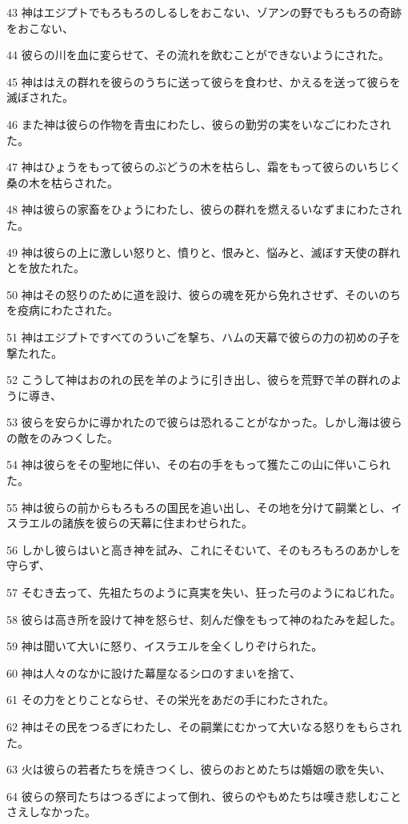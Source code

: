 \par 43 神はエジプトでもろもろのしるしをおこない、ゾアンの野でもろもろの奇跡をおこない、
\par 44 彼らの川を血に変らせて、その流れを飲むことができないようにされた。
\par 45 神ははえの群れを彼らのうちに送って彼らを食わせ、かえるを送って彼らを滅ぼされた。
\par 46 また神は彼らの作物を青虫にわたし、彼らの勤労の実をいなごにわたされた。
\par 47 神はひょうをもって彼らのぶどうの木を枯らし、霜をもって彼らのいちじく桑の木を枯らされた。
\par 48 神は彼らの家畜をひょうにわたし、彼らの群れを燃えるいなずまにわたされた。
\par 49 神は彼らの上に激しい怒りと、憤りと、恨みと、悩みと、滅ぼす天使の群れとを放たれた。
\par 50 神はその怒りのために道を設け、彼らの魂を死から免れさせず、そのいのちを疫病にわたされた。
\par 51 神はエジプトですべてのういごを撃ち、ハムの天幕で彼らの力の初めの子を撃たれた。
\par 52 こうして神はおのれの民を羊のように引き出し、彼らを荒野で羊の群れのように導き、
\par 53 彼らを安らかに導かれたので彼らは恐れることがなかった。しかし海は彼らの敵をのみつくした。
\par 54 神は彼らをその聖地に伴い、その右の手をもって獲たこの山に伴いこられた。
\par 55 神は彼らの前からもろもろの国民を追い出し、その地を分けて嗣業とし、イスラエルの諸族を彼らの天幕に住まわせられた。
\par 56 しかし彼らはいと高き神を試み、これにそむいて、そのもろもろのあかしを守らず、
\par 57 そむき去って、先祖たちのように真実を失い、狂った弓のようにねじれた。
\par 58 彼らは高き所を設けて神を怒らせ、刻んだ像をもって神のねたみを起した。
\par 59 神は聞いて大いに怒り、イスラエルを全くしりぞけられた。
\par 60 神は人々のなかに設けた幕屋なるシロのすまいを捨て、
\par 61 その力をとりことならせ、その栄光をあだの手にわたされた。
\par 62 神はその民をつるぎにわたし、その嗣業にむかって大いなる怒りをもらされた。
\par 63 火は彼らの若者たちを焼きつくし、彼らのおとめたちは婚姻の歌を失い、
\par 64 彼らの祭司たちはつるぎによって倒れ、彼らのやもめたちは嘆き悲しむことさえしなかった。
